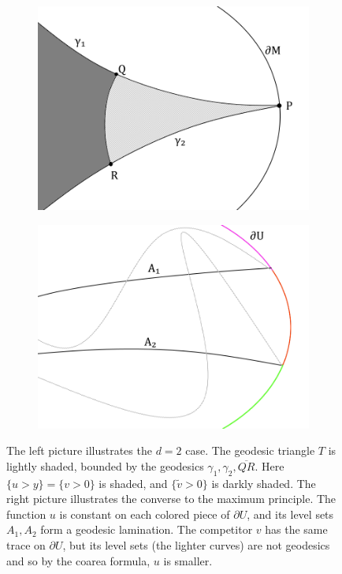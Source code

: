 \documentclass[reqno,10pt]{amsart}
\theoremstyle{definition}
\numberwithin{equation}{section}
\begin{document}
\begin{figure}
\centering
\begin{subfigure}[b]{0.4\linewidth}
\includegraphics[width=\linewidth]{geodesic_triangle.png}
\end{subfigure}
\begin{subfigure}[b]{0.4\linewidth}
\includegraphics[width=\linewidth]{converse_max.png}
\end{subfigure}
\caption{The left picture illustrates the $d = 2$ case.
The geodesic triangle $T$ is lightly shaded, bounded by the geodesics $\gamma_1, \gamma_2, \overline{QR}$. Here $\{u > y\} = \{v > 0\}$ is shaded, and $\{\tilde v > 0\}$ is darkly shaded.
The right picture illustrates the converse to the maximum principle. The function $u$ is constant on each colored piece of $\partial U$, and its level sets $A_1, A_2$ form a geodesic lamination.
The competitor $v$ has the same trace on $\partial U$, but its level sets (the lighter curves) are not geodesics and so by the coarea formula, $u$ is smaller.}
\label{max_princip_graphs}
\end{figure}
\end{document}
